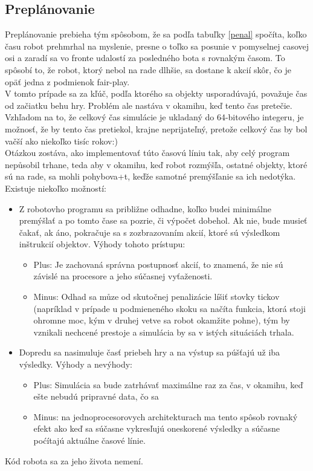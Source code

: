 \subsection{Preplánovanie}
Preplánovanie prebieha tým spôsobom, že sa podľa tabuľky \ref{penal} spočíta, koľko času robot prehmrhal na myslenie, presne o toľko sa posunie v pomyselnej casovej osi a zaradí sa vo fronte udalostí za posledného bota s rovnakým časom. To spôsobí to, že robot, ktorý nebol na rade dlhšie, sa dostane k akcií skôr, čo je opäť jedna z podmienok fair-play.\\
V tomto prípade sa za kľúč, podľa ktorého sa objekty usporadúvajú, považuje čas od začiatku behu hry. Problém ale nastáva v okamihu, keď tento čas pretečie. Vzhľadom na to, že celkový čas simulácie je ukladaný do 64-bitového integeru, je možnosť, že by tento čas pretiekol, krajne neprijateľný, pretože celkový čas by bol vačší ako niekoľko tisíc rokov:)\\
Otázkou zostáva, ako implementovať túto časovú líniu tak, aby celý program nepůsobil trhane, teda aby v okamihu, keď robot rozmýšľa, ostatné objekty, ktoré sú na rade, sa mohli pohybova+t, keďže samotné premýšľanie sa ich nedotýka. Existuje niekoľko možností:
\begin{itemize}
\item Z robotovho programu sa približne odhadne, koľko budei minimálne premýšlať a po tomto čase sa pozrie, či výpočet dobehol. Ak nie, bude musieť čakať, ak áno, pokračuje sa s zozbrazovaním akcií, ktoré sú výsledkom inštrukcií objektov. 
Výhody tohoto prístupu:\begin{itemize}
	\item Plus: Je zachovaná správna postupnosť akcií, to znamená, že nie sú závislé na procesore a jeho súčasnej vyťaženosti.
	\item Minus: Odhad sa můze od skutočnej penalizácie líšiť stovky tickov (napríklad v prípade u podmieneného skoku sa načíta funkcia, ktorá stoji ohromne moc, kým v druhej vetve sa robot okamžite pohne), tým by vznikali nechcené prestoje a simulácia by sa v istých situáciách trhala.
	\end{itemize}
\item Dopredu sa nasimuluje časť priebeh hry a na výstup sa púšťajú už iba výsledky. Výhody a nevýhody:
	\begin{itemize}
	\item Plus: Simulácia sa bude zatrhávať maximálne raz za čas, v okamihu, keď ešte nebudú pripravné data, čo sa 
	\item Minus: na jednoprocesorovych architekturach ma tento spôsob rovnaký efekt ako keď sa súčasne vykresľujú oneskorené výsledky a súčasne poćítajú aktuálne časové línie.
	\end{itemize}
\end{itemize}
Kód robota sa za jeho života nemení. 

